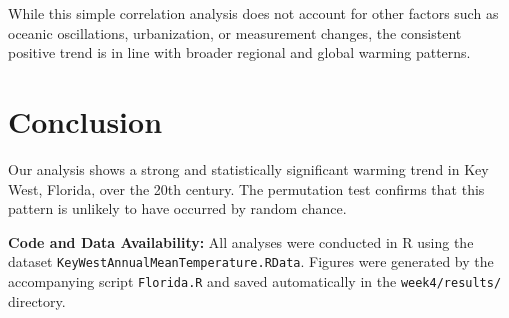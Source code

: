 \documentclass[a4paper,12pt]{article}
\begin{document}
While this simple correlation analysis does not account for other factors such as oceanic oscillations, urbanization, or measurement changes, the consistent positive trend is in line with broader regional and global warming patterns.

\section*{Conclusion}
Our analysis shows a strong and statistically significant warming trend in Key West, Florida, over the 20th century.
The permutation test confirms that this pattern is unlikely to have occurred by random chance.

\vspace{1em}
\noindent\textbf{Code and Data Availability:}  
All analyses were conducted in R using the dataset \texttt{KeyWestAnnualMeanTemperature.RData}.  
Figures were generated by the accompanying script \texttt{Florida.R} and saved automatically in the \texttt{week4/results/} directory.
\end{document}
